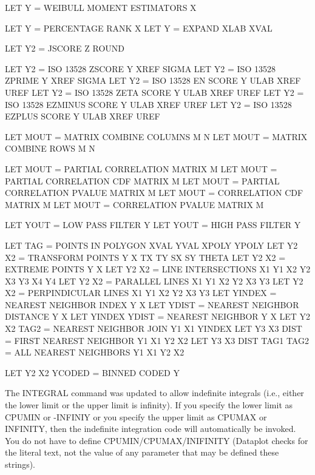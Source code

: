 {          LET Y = WEIBULL MOMENT ESTIMATORS X

          LET Y = PERCENTAGE RANK X
          LET Y = EXPAND XLAB XVAL

          LET Y2 = JSCORE Z ROUND

          LET Y2 = ISO 13528 ZSCORE         Y XREF SIGMA
          LET Y2 = ISO 13528 ZPRIME         Y XREF SIGMA
          LET Y2 = ISO 13528 EN SCORE       Y ULAB XREF UREF
          LET Y2 = ISO 13528 ZETA SCORE     Y ULAB XREF UREF
          LET Y2 = ISO 13528 EZMINUS SCORE  Y ULAB XREF UREF
          LET Y2 = ISO 13528 EZPLUS  SCORE  Y ULAB XREF UREF

          LET MOUT = MATRIX COMBINE COLUMNS M N
          LET MOUT = MATRIX COMBINE ROWS    M N

          LET MOUT = PARTIAL CORRELATION MATRIX  M
          LET MOUT = PARTIAL CORRELATION CDF MATRIX  M
          LET MOUT = PARTIAL CORRELATION PVALUE MATRIX  M
          LET MOUT = CORRELATION CDF MATRIX  M
          LET MOUT = CORRELATION PVALUE MATRIX  M

          LET YOUT = LOW PASS FILTER Y
          LET YOUT = HIGH PASS FILTER Y

          LET TAG = POINTS IN POLYGON XVAL YVAL XPOLY YPOLY
          LET Y2 X2 = TRANSFORM POINTS Y X TX TY SX SY THETA
          LET Y2 X2 = EXTREME POINTS Y X
          LET Y2 X2 = LINE INTERSECTIONS X1 Y1 X2 Y2 X3 Y3 X4 Y4
          LET Y2 X2 = PARALLEL LINES X1 Y1 X2 Y2 X3 Y3
          LET Y2 X2 = PERPINDICULAR LINES X1 Y1 X2 Y2 X3 Y3
          LET YINDEX = NEAREST NEIGHBOR INDEX Y X
          LET YDIST  = NEAREST NEIGHBOR DISTANCE Y X
          LET YINDEX YDIST  = NEAREST NEIGHBOR Y X
          LET Y2 X2 TAG2 = NEAREST NEIGHBOR JOIN Y1 X1 YINDEX
          LET Y3 X3 DIST = FIRST NEAREST NEIGHBOR Y1 X1 Y2 X2
          LET Y3 X3 DIST TAG1 TAG2 = ALL NEAREST NEIGHBORS Y1 X1 Y2 X2

          LET Y2 X2 YCODED = BINNED CODED Y

       The INTEGRAL command was updated to allow indefinite integrals
       (i.e., either the lower limit or the upper limit is infinity).
       If you specify the lower limit as CPUMIN or -INFINIY or you
       specify the upper limit as CPUMAX or INFINITY, then the
       indefinite integration code will automatically be invoked.
       You do not have to define CPUMIN/CPUMAX/INIFINITY (Dataplot
       checks for the literal text, not the value of any parameter
       that may be defined these strings).

}
